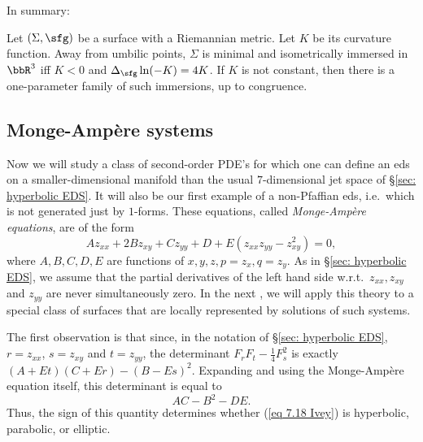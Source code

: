 In summary:
\begin{thm}
    Let $(\Sigma,\sfg)$ be a surface with a Riemannian metric. Let $K$ be its curvature function. Away from umbilic points, $\Sigma$ is minimal and isometrically immersed in $\bbR^3$ iff $K<0$ and $\Delta_{\sfg}\ln (-K)=4K$. If $K$ is not constant, then there is a one-parameter family of such immersions, up to congruence.
\end{thm}








\subsection{Monge-Amp\`ere systems}


Now we will study a class of second-order PDE's for which one can define an \gls{eds} on a smaller-dimensional manifold than the usual $7$-dimensional jet space of \S\ref{sec: hyperbolic EDS}. It will also be our first example of a non-Pfaffian \gls{eds}, i.e.\ which is not generated just by $1$-forms. These equations, called \emph{Monge-Amp\`ere equations}, are of the form 
\[Az_{xx}+2Bz_{xy}+Cz_{yy}+D+E(z_{xx}z_{yy}-z_{xy}^2)=0,\label{eq 7.18 Ivey}\]
where $A,B,C,D,E$ are functions of $x,y,z,p=z_x,q=z_y$. As in \S\ref{sec: hyperbolic EDS}, we assume that the partial derivatives of the left hand side w.r.t.\ $z_{xx},z_{xy}$ and $z_{yy}$ are never simultaneously zero. In the next \subsect, we will apply this theory to a special class of surfaces that are locally represented by solutions of such systems.

The first observation is that since, in the notation of \S\ref{sec: hyperbolic EDS}, $r=z_{xx}$, $s=z_{xy}$ and $t=z_{yy}$, the determinant $F_rF_t-\frac14 F_s^2$ is exactly $(A+Et)(C+Er)-(B-Es)^2$. Expanding and using the Monge-Amp\`ere equation itself, this determinant is equal to
\[AC-B^2-DE.\]
Thus, the sign of this quantity determines whether (\ref{eq 7.18 Ivey}) is hyperbolic, parabolic, or elliptic.

